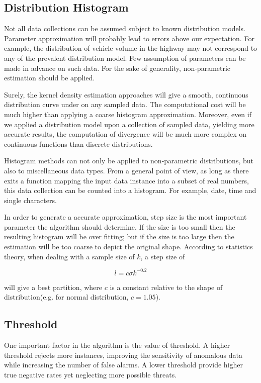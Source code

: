 \documentclass[a4paper]{IEEEtran}
\begin{document}
		\subsection{Distribution Histogram}\label{sec:alg-histogram}
			Not all data collections can be assumed subject to known distribution models. Parameter approximation will probably lead to errors above our expectation. For example, the distribution of vehicle volume in the highway may not correspond to any of the prevalent distribution model. Few assumption of parameters can be made in advance on such data. For the sake of generality, non-parametric estimation should be applied.
			
			Surely, the kernel density estimation approaches will give a smooth, continuous distribution curve under on any sampled data. The computational cost will be much higher than applying a coarse histogram approximation.
			Moreover, even if we applied a distribution model upon a collection of sampled data, yielding more accurate results, the computation of divergence will be much more complex on continuous functions than discrete distributions.
			
			Histogram methods can not only be applied to non-parametric distributions, but also to miscellaneous data types. From a general point of view, as long as there exits a function mapping the input data instance into a subset of real numbers, this data collection can be counted into a histogram. For example, date, time and single characters.
			
			In order to generate a accurate approximation, step size is the most important parameter the algorithm should determine. If the size is too small then the resulting histogram will be over fitting; but if the size is too large then the estimation will be too coarse to depict the original shape. According to statistics theory, when dealing with a sample size of $k$, a step size of 
			
			\begin{equation}\label{equ:step-size}
				l = c \sigma k^{-0.2}
			\end{equation}
			
			will give a best partition, where $c$ is a constant relative to the shape of distribution(e.g. for normal distribution, $c=1.05$).
			
		\subsection{Threshold}\label{sec:alg-threshold}
			One important factor in the algorithm is the value of threshold. A higher threshold rejects more instances, improving the sensitivity of anomalous data while increasing the number of false alarms. A lower threshold provide higher true negative rates yet neglecting more possible threats.
			
\end{document}
